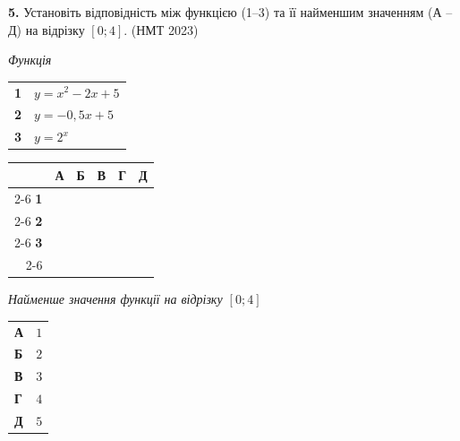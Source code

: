 \documentclass[14pt]{extarticle}
\newcommand{\nmtyear}[1]{\hfill{\small\color{yearcolor}(НМТ #1)}}
\begin{document}
\vspace{0.7cm}

\noindent\textbf{5.} Установіть відповідність між функцією (1–3) та її найменшим значенням (А – Д) на відрізку $[0; 4]$. \nmtyear{2023}

\vspace{0.3cm}

\noindent
\begin{minipage}[t]{0.45\textwidth}
    \textit{Функція} \par \vspace{0.2cm}
    \begin{tabular}{@{}p{0.5cm} p{5cm}@{}}
    \textbf{1} & $y=x^2-2x+5$ \\[0.3cm]
    \textbf{2} & $y=-0{,}5x+5$ \\[0.3cm]
    \textbf{3} & $y=2^x$ \\
    \end{tabular}
    
    \vspace{0.5cm}
    
    \begingroup
    \setlength{\tabcolsep}{4pt}
    \renewcommand{\arraystretch}{1.2}
    \small
    \begin{tabular}{r|c|c|c|c|c|}
         \multicolumn{1}{c}{} & \multicolumn{1}{c}{\textbf{А}} & \multicolumn{1}{c}{\textbf{Б}} & \multicolumn{1}{c}{\textbf{В}} & \multicolumn{1}{c}{\textbf{Г}} & \multicolumn{1}{c}{\textbf{Д}} \\ \cline{2-6}
         \textbf{1} & & & & & \\ \cline{2-6}
         \textbf{2} & & & & & \\ \cline{2-6}
         \textbf{3} & & & & & \\ \cline{2-6}
    \end{tabular}
    \endgroup
\end{minipage}%
\hfill
\begin{minipage}[t]{0.50\textwidth}
    \textit{Найменше значення функції на відрізку $[0; 4]$} \par \vspace{0.2cm}
    \begin{tabular}{@{}p{0.5cm} p{7.5cm}@{}}
    \textbf{А} & $1$ \\[0.3cm]
    \textbf{Б} & $2$ \\[0.3cm]
    \textbf{В} & $3$ \\[0.3cm]
    \textbf{Г} & $4$ \\[0.3cm]
    \textbf{Д} & $5$ \\
    \end{tabular}
\end{minipage}
\end{document}
